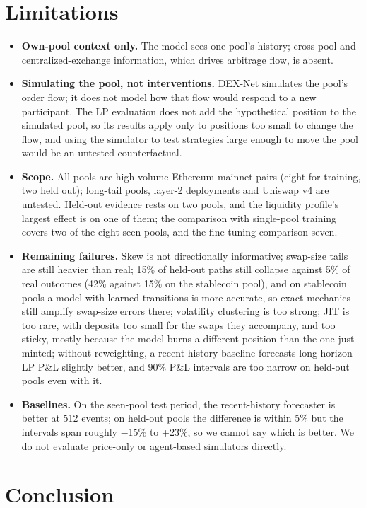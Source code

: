 \documentclass[11pt]{article}
\begin{document}
\section{Limitations}

\begin{itemize}
\item \textbf{Own-pool context only.} The model sees one pool's history; cross-pool and centralized-exchange information, which drives arbitrage flow, is absent.
\item \textbf{Simulating the pool, not interventions.} DEX-Net simulates the pool's order flow; it does not model how that flow would respond to a new participant. The LP evaluation does not add the hypothetical position to the simulated pool, so its results apply only to positions too small to change the flow, and using the simulator to test strategies large enough to move the pool would be an untested counterfactual.
\item \textbf{Scope.} All pools are high-volume Ethereum mainnet pairs (eight for training, two held out); long-tail pools, layer-2 deployments and Uniswap v4 are untested. Held-out evidence rests on two pools, and the liquidity profile's largest effect is on one of them; the comparison with single-pool training covers two of the eight seen pools, and the fine-tuning comparison seven.
\item \textbf{Remaining failures.} Skew is not directionally informative; swap-size tails are still heavier than real; 15\% of held-out paths still collapse against 5\% of real outcomes (42\% against 15\% on the stablecoin pool), and on stablecoin pools a model with learned transitions is more accurate, so exact mechanics still amplify swap-size errors there; volatility clustering is too strong; JIT is too rare, with deposits too small for the swaps they accompany, and too sticky, mostly because the model burns a different position than the one just minted; without reweighting, a recent-history baseline forecasts long-horizon LP P\&L slightly better, and 90\% P\&L intervals are too narrow on held-out pools even with it.
\item \textbf{Baselines.} On the seen-pool test period, the recent-history forecaster is better at 512 events; on held-out pools the difference is within 5\% but the intervals span roughly \ensuremath{-}15\% to +23\%, so we cannot say which is better. We do not evaluate price-only or agent-based simulators directly.
\end{itemize}

\section{Conclusion}
\end{document}
